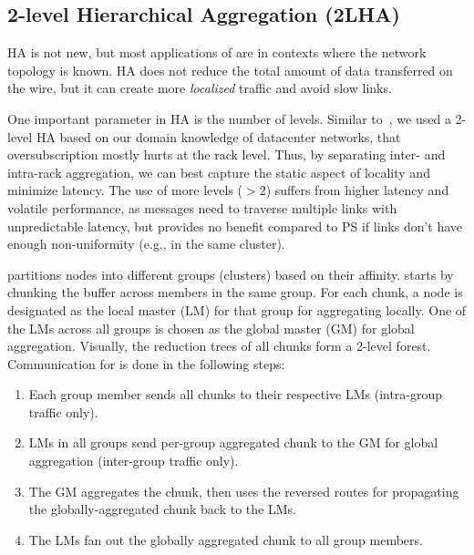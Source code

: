 \subsection{2-level Hierarchical Aggregation (2LHA)}
HA is not new, but most applications of \mlha are in contexts where the network topology is known. HA does not reduce the total amount of data transferred on the wire, but it can create more \textit{localized} traffic and avoid slow links.


One important parameter in HA is the number of levels. Similar to~\cite{cool}, we used a 2-level HA based on our domain knowledge of datacenter networks, that oversubscription mostly hurts at the rack level. Thus, by separating inter- and intra-rack aggregation, we can best capture the static aspect of locality and minimize latency. The use of more levels ($>2$) suffers from higher latency and volatile performance, as messages need to traverse multiple links with unpredictable latency, but provides no benefit compared to PS if links don't have enough non-uniformity (e.g., in the same cluster). %


\label{sec:2lhaOverview}
\mlha partitions nodes into different groups (clusters) based on their affinity. \mlha starts by chunking the buffer across members in the same group. For each chunk, a node is designated as the local master (LM) for that group for aggregating locally. One of the LMs across all groups is chosen as the global master (GM) for global aggregation. Visually, the reduction trees of all chunks form a 2-level forest. Communication for \mlha is done in the following steps: 

\begin{enumerate}[noitemsep,topsep=0pt,parsep=0pt,partopsep=0pt]
  \item Each group member sends all chunks to their respective LMs (intra-group traffic only).
  \item LMs in all groups send per-group aggregated chunk to the GM for global aggregation (inter-group traffic only).
  \item The GM aggregates the chunk, then uses the reversed routes for propagating the globally-aggregated chunk back to the LMs.
  \item The LMs fan out the globally aggregated chunk to all group members.
\end{enumerate}

